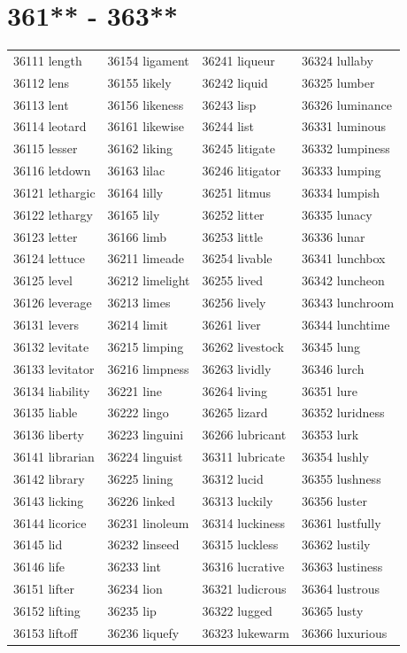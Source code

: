 \documentclass[10pt, oneside]{book}
\begin{document}
\begin{table}
	\centering
	\section*{361** - 363**}
	\begin{tabular}{l l l l}
36111 length &36154 ligament &36241 liqueur &36324 lullaby\\
36112 lens &36155 likely &36242 liquid &36325 lumber\\
36113 lent &36156 likeness &36243 lisp &36326 luminance\\
36114 leotard &36161 likewise &36244 list &36331 luminous\\
36115 lesser &36162 liking &36245 litigate &36332 lumpiness\\
36116 letdown &36163 lilac &36246 litigator &36333 lumping\\
36121 lethargic &36164 lilly &36251 litmus &36334 lumpish\\
36122 lethargy &36165 lily &36252 litter &36335 lunacy\\
36123 letter &36166 limb &36253 little &36336 lunar\\
36124 lettuce &36211 limeade &36254 livable &36341 lunchbox\\
36125 level &36212 limelight &36255 lived &36342 luncheon\\
36126 leverage &36213 limes &36256 lively &36343 lunchroom\\
36131 levers &36214 limit &36261 liver &36344 lunchtime\\
36132 levitate &36215 limping &36262 livestock &36345 lung\\
36133 levitator &36216 limpness &36263 lividly &36346 lurch\\
36134 liability &36221 line &36264 living &36351 lure\\
36135 liable &36222 lingo &36265 lizard &36352 luridness\\
36136 liberty &36223 linguini &36266 lubricant &36353 lurk\\
36141 librarian &36224 linguist &36311 lubricate &36354 lushly\\
36142 library &36225 lining &36312 lucid &36355 lushness\\
36143 licking &36226 linked &36313 luckily &36356 luster\\
36144 licorice &36231 linoleum &36314 luckiness &36361 lustfully\\
36145 lid &36232 linseed &36315 luckless &36362 lustily\\
36146 life &36233 lint &36316 lucrative &36363 lustiness\\
36151 lifter &36234 lion &36321 ludicrous &36364 lustrous\\
36152 lifting &36235 lip &36322 lugged &36365 lusty\\
36153 liftoff &36236 liquefy &36323 lukewarm &36366 luxurious\\
	\end{tabular}
 \end{table}
\clearpage
\end{document}
